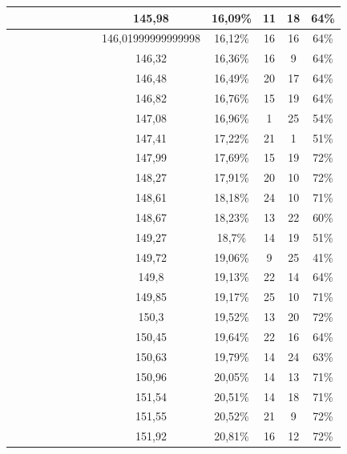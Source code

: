 \begin{center}
\begin{longtable}{|c|c|c|c|c|c|c|c|c|c|c|c|c|}
 \x &  &  \x &  &  \x &  &  \x &  \x & 145,98 & 16,09\% & 11 & 18 & 64\% \\ \hline
 \x &  &  \x &  &  &  &  \x &  \x & 146,01999999999998 & 16,12\% & 16 & 16 & 64\% \\ \hline
 \x &  \x &  \x &  \x &  &  &  \x &  \x & 146,32 & 16,36\% & 16 & 9 & 64\% \\ \hline
 \x &  &  \x &  \x &  &  &  &  \x & 146,48 & 16,49\% & 20 & 17 & 64\% \\ \hline
 \x &  &  \x &  &  \x &  &  &  \x & 146,82 & 16,76\% & 15 & 19 & 64\% \\ \hline
 \x &  \x &  &  &  &  &  \x &  \x & 147,08 & 16,96\% & 1 & 25 & 54\% \\ \hline
 \x &  &  &  \x &  &  &  &  \x & 147,41 & 17,22\% & 21 & 1 & 51\% \\ \hline
 \x &  \x &  &  \x &  \x &  \x &  \x &  \x & 147,99 & 17,69\% & 15 & 19 & 72\% \\ \hline
 \x &  \x &  \x &  \x &  &  \x &  \x &  \x & 148,27 & 17,91\% & 20 & 10 & 72\% \\ \hline
 \x &  &  \x &  \x &  \x &  \x &  &  \x & 148,61 & 18,18\% & 24 & 10 & 71\% \\ \hline
 \x &  &  &  \x &  \x &  &  &  \x & 148,67 & 18,23\% & 13 & 22 & 60\% \\ \hline
 \x &  &  &  \x &  &  &  &  \x & 149,27 & 18,7\% & 14 & 19 & 51\% \\ \hline
 \x &  &  &  &  &  &  &  \x & 149,72 & 19,06\% & 9 & 25 & 41\% \\ \hline
 \x &  &  \x &  &  &  &  \x &  \x & 149,8 & 19,13\% & 22 & 14 & 64\% \\ \hline
 \x &  \x &  \x &  \x &  &  \x &  &  \x & 149,85 & 19,17\% & 25 & 10 & 71\% \\ \hline
 \x &  &  &  &  &  \x &  \x &  \x & 150,3 & 19,52\% & 13 & 20 & 72\% \\ \hline
 \x &  \x &  \x &  \x &  &  &  \x &  \x & 150,45 & 19,64\% & 22 & 16 & 64\% \\ \hline
 \x &  &  \x &  \x &  \x &  &  &  \x & 150,63 & 19,79\% & 14 & 24 & 63\% \\ \hline
 \x &  &  \x &  \x &  &  \x &  &  \x & 150,96 & 20,05\% & 14 & 13 & 71\% \\ \hline
 \x &  &  \x &  &  \x &  \x &  &  \x & 151,54 & 20,51\% & 14 & 18 & 71\% \\ \hline
 \x &  &  &  &  \x &  \x &  &  \x & 151,55 & 20,52\% & 21 & 9 & 72\% \\ \hline
 \x &  &  \x &  &  &  \x &  \x &  \x & 151,92 & 20,81\% & 16 & 12 & 72\% \\ \hline

\end{longtable}
\end{center}
